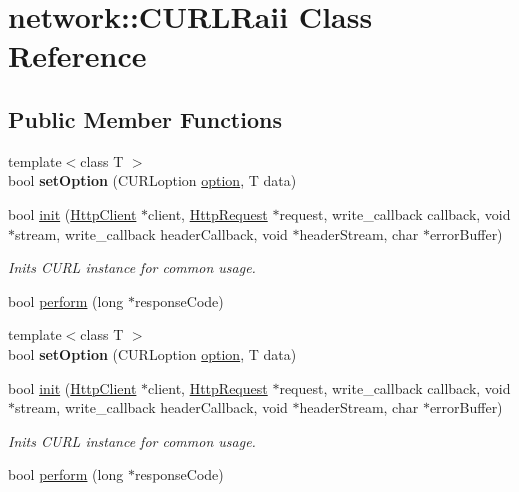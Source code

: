 \hypertarget{classnetwork_1_1CURLRaii}{}\section{network\+:\+:C\+U\+R\+L\+Raii Class Reference}
\label{classnetwork_1_1CURLRaii}
\subsection*{Public Member Functions}
\begin{DoxyCompactItemize}
\item 
\mbox{\label{classnetwork_1_1CURLRaii_a5381af67d8446adab4266497d123b0a1}} 
{\footnotesize template$<$class T $>$ }\\bool {\bfseries set\+Option} (C\+U\+R\+Loption \hyperlink{structoption}{option}, T data)
\item 
bool \hyperlink{classnetwork_1_1CURLRaii_a3cc7723ead5c207d3bb942e7e9bd91c7}{init} (\hyperlink{classnetwork_1_1HttpClient}{Http\+Client} $\ast$client, \hyperlink{classnetwork_1_1HttpRequest}{Http\+Request} $\ast$request, write\+\_\+callback callback, void $\ast$stream, write\+\_\+callback header\+Callback, void $\ast$header\+Stream, char $\ast$error\+Buffer)
\begin{DoxyCompactList}\small\item\em Inits C\+U\+RL instance for common usage. \end{DoxyCompactList}\item 
bool \hyperlink{classnetwork_1_1CURLRaii_a32715792d668e246aabfa9f8c1692465}{perform} (long $\ast$response\+Code)
\item 
\mbox{\label{classnetwork_1_1CURLRaii_a5381af67d8446adab4266497d123b0a1}} 
{\footnotesize template$<$class T $>$ }\\bool {\bfseries set\+Option} (C\+U\+R\+Loption \hyperlink{structoption}{option}, T data)
\item 
bool \hyperlink{classnetwork_1_1CURLRaii_a3cc7723ead5c207d3bb942e7e9bd91c7}{init} (\hyperlink{classnetwork_1_1HttpClient}{Http\+Client} $\ast$client, \hyperlink{classnetwork_1_1HttpRequest}{Http\+Request} $\ast$request, write\+\_\+callback callback, void $\ast$stream, write\+\_\+callback header\+Callback, void $\ast$header\+Stream, char $\ast$error\+Buffer)
\begin{DoxyCompactList}\small\item\em Inits C\+U\+RL instance for common usage. \end{DoxyCompactList}\item 
bool \hyperlink{classnetwork_1_1CURLRaii_a32715792d668e246aabfa9f8c1692465}{perform} (long $\ast$response\+Code)
\end{DoxyCompactItemize}


